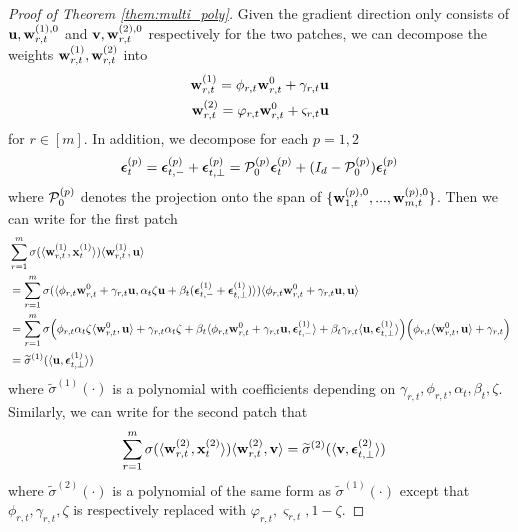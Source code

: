 \begin{proof}[Proof of Theorem \ref{them:multi_poly}]
Given the gradient direction only consists of ${\mathbf u}, {\mathbf w}_{r,t}^{(1),0}$ and ${\mathbf v}, {\mathbf w}_{r,t}^{(2),0}$ respectively for the two patches, we can decompose the weights ${\mathbf w}_{r,t}^{(1)}, {\mathbf w}_{r,t}^{(2)}$ into
\begin{align*}
    {\mathbf w}_{r,t}^{(1)} = \phi_{r,t} {\mathbf w}_{r,t}^0 + \gamma_{r,t} {\mathbf u} \\
    {\mathbf w}_{r,t}^{(2)} = \varphi_{r,t} {\mathbf w}_{r,t}^0 + \varsigma_{r,t} {\mathbf u}
\end{align*}
for $r \in [m]$. In addition, we decompose for each $p = 1,2$
\begin{align*}
    {\boldsymbol{\epsilon}}_t^{(p)} = {{\boldsymbol{\epsilon}}}_{t,-}^{(p)} +  {\boldsymbol{\epsilon}}_{t, \perp}^{(p)} = {\mathcal{P}}^{(p)}_0 {\boldsymbol{\epsilon}}_t^{(p)} + (I_d - {\mathcal{P}}^{(p)}_0) {\boldsymbol{\epsilon}}_{t}^{(p)}
\end{align*}
where ${\mathcal{P}}^{(p)}_0$ denotes the projection onto the span of $\{ {\mathbf w}^{(p),0}_{1,t}, ..., {\mathbf w}^{(p),0}_{m,t}  \}$. Then we can write for the first patch
\begin{align*}
    &\sum_{r=1}^m \sigma(\langle {\mathbf w}_{r,t}^{(1)}, {\mathbf{x}}_t^{(1)} \rangle) \langle {\mathbf w}_{r,t}^{(1)}, {\mathbf u} \rangle \\
    &= \sum_{r=1}^m\sigma( \langle \phi_{r,t} {\mathbf w}_{r,t}^0 + \gamma_{r,t} {\mathbf u}, \alpha_t \zeta {\mathbf u} + \beta_t ( {{\boldsymbol{\epsilon}}}_{t,-}^{(1)} +  {\boldsymbol{\epsilon}}_{t, \perp}^{(1)}  ) \rangle ) \langle \phi_{r,t} {\mathbf w}_{r,t}^0 + \gamma_{r,t} {\mathbf u} , {\mathbf u}  \rangle\\
    &= \sum_{r=1}^m\sigma\Big(  \phi_{r,t} \alpha_t \zeta \langle  {\mathbf w}_{r,t}^0, {\mathbf u} \rangle + \gamma_{r,t} \alpha_t \zeta + \beta_t \langle \phi_{r,t} {\mathbf w}_{r,t}^0 + \gamma_{r,t} {\mathbf u}, {\boldsymbol{\epsilon}}_{t,-}^{(1)} \rangle + \beta_t \gamma_{r,t} \langle {\mathbf u}, {\boldsymbol{\epsilon}}_{t,\perp}^{(1)} \rangle \Big) \Big( \phi_{r,t} \langle {\mathbf w}_{r,t}^0 ,{\mathbf u}\rangle + \gamma_{r,t} \Big) \\
    &= \widetilde \sigma^{(1)}( \langle {\mathbf u}, {\boldsymbol{\epsilon}}_{t, \perp}^{(1)} \rangle )
\end{align*} 
where $\widetilde \sigma^{(1)}(\cdot)$ is a polynomial with coefficients depending on $\gamma_{r,t}, \phi_{r,t}, \alpha_t, \beta_t, \zeta$. Similarly, we can write for the second patch that 
\begin{align*}
    &\sum_{r=1}^m \sigma(\langle {\mathbf w}_{r,t}^{(2)}, {\mathbf{x}}_t^{(2)} \rangle) \langle {\mathbf w}_{r,t}^{(2)}, {\mathbf v} \rangle  = \widetilde \sigma^{(2)} (\langle {\mathbf v}, {\boldsymbol{\epsilon}}_{t,\perp}^{(2)} \rangle)
\end{align*}
where $\widetilde \sigma^{(2)}(\cdot)$ is a polynomial of the same form as $\widetilde \sigma^{(1)}(\cdot)$ except that $\phi_{r,t}, \gamma_{r,t}, \zeta$ is respectively replaced with $\varphi_{r,t}, \varsigma_{r,t}, 1- \zeta$.

\end{proof}
